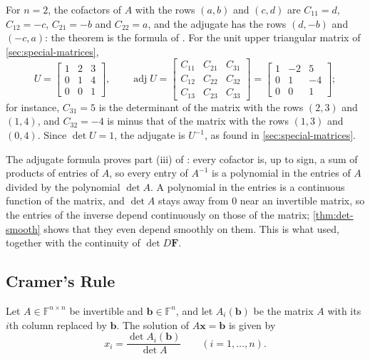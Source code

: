 For $n=2$, the cofactors of $A$ with the rows $(a,b)$ and $(c,d)$ are $C_{11}=d$, $C_{12}=-c$, $C_{21}=-b$ and $C_{22}=a$, and the adjugate has the rows $(d,-b)$ and $(-c,a)$: the theorem is the formula of . For the unit upper triangular matrix of \cref{sec:special-matrices},
\[
U=\begin{bmatrix}1&2&3\\0&1&4\\0&0&1\end{bmatrix},\qquad\operatorname{adj}U=\begin{bmatrix}C_{11}&C_{21}&C_{31}\\C_{12}&C_{22}&C_{32}\\C_{13}&C_{23}&C_{33}\end{bmatrix}=\begin{bmatrix}1&-2&5\\0&1&-4\\0&0&1\end{bmatrix};
\]
for instance, $C_{31}=5$ is the determinant of the matrix with the rows $(2,3)$ and $(1,4)$, and $C_{32}=-4$ is minus that of the matrix with the rows $(1,3)$ and $(0,4)$. Since $\det U=1$, the adjugate is $U^{-1}$, as found in \cref{sec:special-matrices}.

The adjugate formula proves part (iii) of : every cofactor is, up to sign, a sum of products of entries of $A$, so every entry of $A^{-1}$ is a polynomial in the entries of $A$ divided by the polynomial $\det A$. A polynomial in the entries is a continuous function of the matrix, and $\det A$ stays away from $0$ near an invertible matrix, so the entries of the inverse depend continuously on those of the matrix; \cref{thm:det-smooth} shows that they even depend smoothly on them. This is what  used, together with the continuity of $\det D\mathbf F$.

\subsection{Cramer's Rule}

\begin{theorem}
\label{thm:cramer}
Let $A\in\mathbb F^{n\times n}$ be invertible and $\mathbf b\in\mathbb F^n$, and let $A_i(\mathbf b)$ be the matrix $A$ with its $i$th column replaced by $\mathbf b$. The solution of $A\mathbf x=\mathbf b$ is given by
\[
x_i=\frac{\det A_i(\mathbf b)}{\det A}\qquad(i=1,\ldots,n).
\]
\end{theorem}

